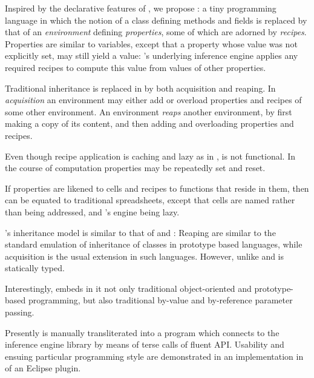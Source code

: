 Inspired by the declarative features of , we propose \Reap: a tiny
programming language in which the notion of a class defining methods and fields
is replaced by that of an \emph{environment} defining \emph{properties}, some
of which are adorned by \emph{recipes}.  Properties are similar to variables,
   except that a property whose value was not explicitly set, may still yield a
   value: \Reap's underlying inference engine applies any required recipes to
   compute this value from values of other properties. 

Traditional inheritance is replaced in \Reap by both acquisition and reaping.
In \emph{acquisition} an environment may either add or overload properties and
recipes of some other environment. An environment \emph{reaps} another
environment, by first making a copy of its content, and then adding and
overloading properties and recipes. 

Even though recipe application is caching and lazy as in
, \Reap is not functional. In the course of
computation properties may be repeatedly set and reset.

If properties are likened to cells and recipes to functions that reside in them,
then \Reap can be equated to traditional spreadsheets, except that cells
   are named rather than being addressed, and \Reap's engine being lazy. 
   
\Reap's inheritance model is similar to that of  and
: Reaping are similar to the standard emulation of
inheritance of classes in prototype based languages, while acquisition is the
usual extension in such languages.  However, unlike  and
 \Reap is statically typed.

Interestingly, \Reap embeds in it not only traditional object-oriented and
prototype-based programming, but also traditional by-value and by-reference
parameter passing.  

Presently \Reap is manually transliterated into a  program
which connects to the inference engine library by means of terse calls of
fluent API. Usability and ensuing particular programming style are demonstrated
in an implementation in of an Eclipse plugin. 
